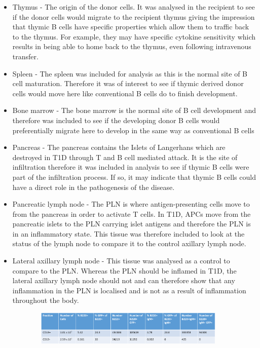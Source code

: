 \begin{itemize}
\item Thymus - The origin of the donor cells. It was analysed in the recipient to see if the donor cells would migrate to the recipient thymus giving the impression that thymic B cells have specific properties which allow them to traffic back to the thymus.
For example, they may have specific cytokine sensitivity which results in being able to home back to the thymus, even following intravenous transfer.
\item Spleen - The spleen was included for analysis as this is the normal site of B cell maturation.
Therefore it was of interest to see if thymic derived donor cells would move here like conventional B cells do to finish development.
\item Bone marrow - The bone marrow is the normal site of B cell development and therefore was included to see if the developing donor B cells would preferentially migrate here to develop in the same way as conventional B cells
\item Pancreas - The pancreas contains the Islets of Langerhans which are destroyed in T1D through T and B cell mediated attack.
It is the site of infiltration therefore it was included in analysis to see if thymic B cells were part of the infiltration process.
If so, it may indicate that thymic B cells could have a direct role in the pathogenesis of the disease.
\item Pancreatic lymph node - The PLN is where antigen-presenting cells move to from the pancreas in order to activate T cells.
In T1D, APCs move from the pancreatic islets to the PLN carrying islet antigens and therefore the PLN is in an inflammatory state.
This tissue was therefore included to look at the status of the lymph node to compare it to the control axillary lymph node.
\item Lateral axillary lymph node - This tissue was analysed as a control to compare to the PLN.
Whereas the PLN should be inflamed in T1D, the lateral axillary lymph node should not and can therefore show that any inflammation in the PLN is localised and is not as a result of inflammation throughout the body.
\end{itemize}


\begin{figure}
	\begin{subfigure}{\textwidth}
	\includegraphics[width=\textwidth]{Figures/GFPdonortable.png}
	\end{subfigure}
\end{figure}



